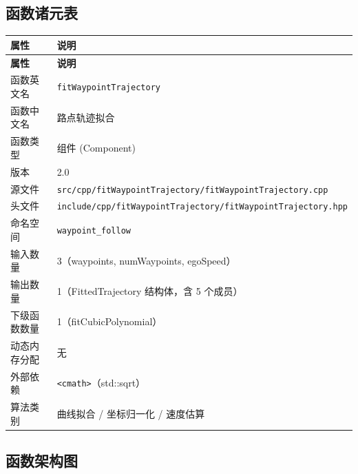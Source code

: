 \documentclass[a4paper,10pt]{article}
\begin{document}
\subsection{函数诸元表}

\renewcommand{\arraystretch}{1.3}
\begin{longtable}{|L{3.8cm}|L{11.5cm}|}
\hline
\textbf{属性} & \textbf{说明} \\
\hline
\endfirsthead
\hline
\textbf{属性} & \textbf{说明} \\
\hline
\endhead
函数英文名 & \texttt{fitWaypointTrajectory} \\
\hline
函数中文名 & 路点轨迹拟合 \\
\hline
函数类型 & 组件 (Component) \\
\hline
版本 & 2.0 \\
\hline
源文件 & \texttt{src/cpp/fitWaypointTrajectory/fitWaypointTrajectory.cpp} \\
\hline
头文件 & \texttt{include/cpp/fitWaypointTrajectory/fitWaypointTrajectory.hpp} \\
\hline
命名空间 & \texttt{waypoint\_follow} \\
\hline
输入数量 & 3（waypoints, numWaypoints, egoSpeed） \\
\hline
输出数量 & 1（FittedTrajectory 结构体，含 5 个成员） \\
\hline
下级函数数量 & 1（fitCubicPolynomial） \\
\hline
动态内存分配 & 无 \\
\hline
外部依赖 & \texttt{<cmath>}（std::sqrt） \\
\hline
算法类别 & 曲线拟合 / 坐标归一化 / 速度估算 \\
\hline
\end{longtable}

\subsection{函数架构图}

\begin{center}
\end{center}
\end{document}
